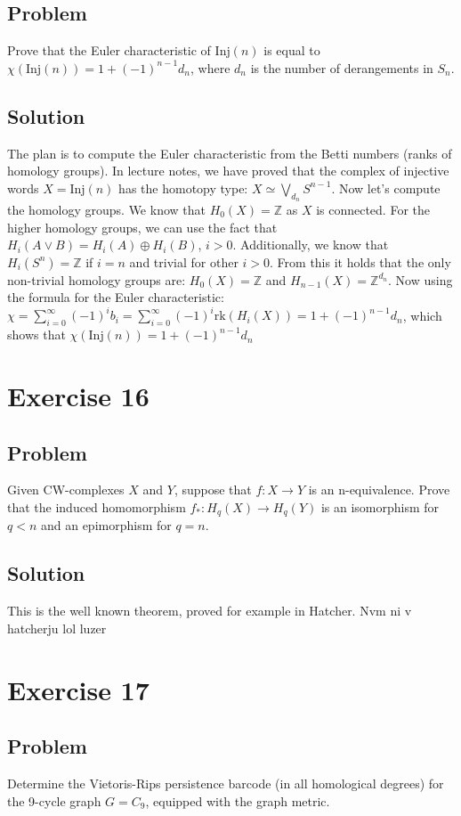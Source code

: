 \documentclass{article}
\begin{document}
\subsection*{Problem}
Prove that the Euler characteristic of $\mathrm{Inj}(n)$ is equal to
$\chi(\mathrm{Inj}(n)) = 1 + (-1)^{n-1} d_n$,
where $d_n$ is the number of derangements in $S_n$.
\subsection*{Solution}
The plan is to compute the Euler characteristic from the Betti numbers (ranks of homology groups).
In lecture notes, we have proved that the complex of injective words
$X = \mathrm{Inj}(n)$ has the homotopy type:
$X \simeq \bigvee_{d_n} S^{n-1}$.
Now let's compute the homology groups.
We know that $H_0(X) = \mathbb{Z}$ as $X$ is connected.
For the higher homology groups, we can use the fact that
$H_i (A \vee B) = H_i(A) \oplus H_i(B)$, $i>0$. Additionally, we know that $H_i (S^n) = \mathbb{Z}$ if $i=n$ and trivial for other $i>0$.
From this it holds that the only non-trivial homology groups are:
$H_0(X) = \mathbb{Z}$ and $H_{n-1}(X) = \mathbb{Z}^{d_n}$.
Now using the formula for the Euler characteristic:
$\chi = \sum_{i=0}^\infty (-1)^i b_i = \sum_{i=0}^\infty (-1)^i \mathrm{rk}(H_i(X)) = 1 + (-1)^{n-1} d_n$,
which shows that $\chi(\mathrm{Inj}(n)) = 1+(-1)^{n-1} d_n$

\section*{Exercise 16}
\subsection*{Problem}
Given CW-complexes $X$ and $Y$, suppose that $f: X \to Y$ is an
n-equivalence. Prove that the induced homomorphism $f_*: H_q(X) \to H_q(Y)$ is an isomorphism for $q < n$ and an epimorphism for $q=n$.
\subsection*{Solution}
This is the well known theorem, proved for example in Hatcher. Nvm ni v hatcherju lol luzer

\section*{Exercise 17}
\subsection*{Problem}
Determine the Vietoris-Rips persistence barcode (in all homological degrees) for the
9-cycle graph $G=C_9$, equipped with the graph metric.
\end{document}
